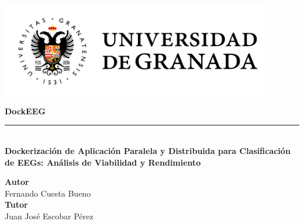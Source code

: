 \begin{titlepage}


    \setlength{\centeroffset}{-0.5\oddsidemargin}
    \addtolength{\centeroffset}{0.5\evensidemargin}
    \thispagestyle{empty}

    \noindent\hspace*{\centeroffset}\begin{minipage}{\textwidth}

        \centering


        \vspace{3.3cm}

        \includegraphics[width=0.9\textwidth]{imagenes/logo_ugr.jpg}
        \vspace{0.5cm}


        {\Huge\bfseries DockEEG\\
        }
        \noindent\rule[-1ex]{\textwidth}{3pt}\\[3.5ex]
        {\large\bfseries Dockerización de Aplicación Paralela y Distribuida para Clasificación de EEGs: Análisis de Viabilidad y Rendimiento\\[4cm]}
    \end{minipage}

    \vspace{2.5cm}
    \noindent\hspace*{\centeroffset}\begin{minipage}{\textwidth}
        \centering

        \textbf{Autor}\\ {Fernando Cuesta Bueno}\\[2.5ex]
        \textbf{Tutor}\\
        {Juan José Escobar Pérez}\\[2cm]
    \end{minipage}


\end{titlepage}


